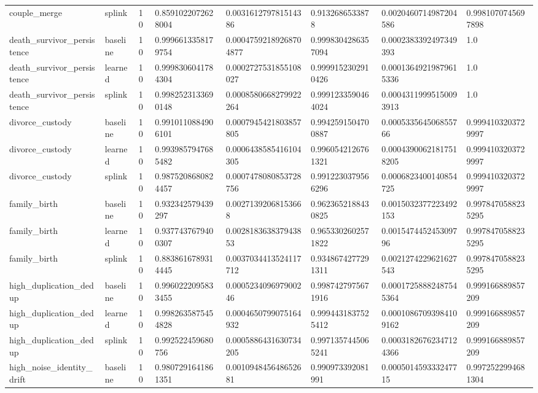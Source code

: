 \begin{longtable}{llllllll}
couple\_merge & splink & 10 & 0.8591022072628004 & 0.003161279781514386 & 0.9132686533878 & 0.0020460714987204586 & 0.9981070745697898 \\
death\_survivor\_persistence & baseline & 10 & 0.9996613358179754 & 0.00047592189268704877 & 0.9998304286357094 & 0.0002383392497349393 & 1.0 \\
death\_survivor\_persistence & learned & 10 & 0.9998306041784304 & 0.0002727531855108027 & 0.9999152302910426 & 0.00013649219879615336 & 1.0 \\
death\_survivor\_persistence & splink & 10 & 0.9982523133690148 & 0.0008580668279922264 & 0.9991233590464024 & 0.00043119995150093913 & 1.0 \\
divorce\_custody & baseline & 10 & 0.9910110884906101 & 0.0007945421803857805 & 0.9942591504700887 & 0.000533564506855766 & 0.9994103203729997 \\
divorce\_custody & learned & 10 & 0.9939857947685482 & 0.0006438585416104305 & 0.9960542126761321 & 0.00043900621817518205 & 0.9994103203729997 \\
divorce\_custody & splink & 10 & 0.9875208680824457 & 0.0007478080853728756 & 0.9912230379566296 & 0.0006823400140854725 & 0.9994103203729997 \\
family\_birth & baseline & 10 & 0.932342579439297 & 0.00271392068153668 & 0.9623652188430825 & 0.0015032377223492153 & 0.9978470588235295 \\
family\_birth & learned & 10 & 0.9377437679400307 & 0.002818363837943853 & 0.9653302602571822 & 0.001547445245309796 & 0.9978470588235295 \\
family\_birth & splink & 10 & 0.8838616789314445 & 0.0037034413524117712 & 0.9348674277291311 & 0.0021274229621627543 & 0.9978470588235295 \\
high\_duplication\_dedup & baseline & 10 & 0.9960222095833455 & 0.000523409697900246 & 0.9987427975671916 & 0.00017258882487545364 & 0.999166889857209 \\
high\_duplication\_dedup & learned & 10 & 0.9982635875454828 & 0.0004650799075164932 & 0.9994431837525412 & 0.00010867093984109162 & 0.999166889857209 \\
high\_duplication\_dedup & splink & 10 & 0.992522459680756 & 0.0005886431630734205 & 0.9971357445065241 & 0.00031826762347124366 & 0.999166889857209 \\
high\_noise\_identity\_drift & baseline & 10 & 0.9807291641861351 & 0.001094845648652681 & 0.990973392081991 & 0.000501459333247715 & 0.9972522994681304 \\

\end{longtable}
